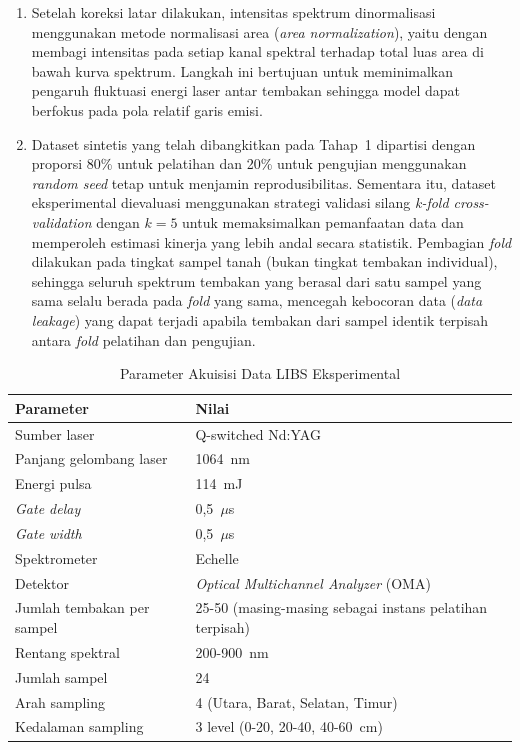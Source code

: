 \begin{enumerate}
    \item Setelah koreksi latar dilakukan, intensitas spektrum dinormalisasi menggunakan metode normalisasi area (\textit{area normalization}), yaitu dengan membagi intensitas pada setiap kanal spektral terhadap total luas area di bawah kurva spektrum. Langkah ini bertujuan untuk meminimalkan pengaruh fluktuasi energi laser antar tembakan sehingga model dapat berfokus pada pola relatif garis emisi.

    \item Dataset sintetis yang telah dibangkitkan pada Tahap~1 dipartisi dengan proporsi 80\% untuk pelatihan dan 20\% untuk pengujian menggunakan \textit{random seed} tetap untuk menjamin reprodusibilitas. Sementara itu, dataset eksperimental dievaluasi menggunakan strategi validasi silang \textit{k-fold cross-validation} dengan $k = 5$ untuk memaksimalkan pemanfaatan data dan memperoleh estimasi kinerja yang lebih andal secara statistik. Pembagian \textit{fold} dilakukan pada tingkat sampel tanah (bukan tingkat tembakan individual), sehingga seluruh spektrum tembakan yang berasal dari satu sampel yang sama selalu berada pada \textit{fold} yang sama, mencegah kebocoran data (\textit{data leakage}) yang dapat terjadi apabila tembakan dari sampel identik terpisah antara \textit{fold} pelatihan dan pengujian.
\end{enumerate}

\begin{table}[htbp]
  \centering
  \caption{Parameter Akuisisi Data LIBS Eksperimental}
  \label{tab:param_eksperimen}
  \small
  \begin{tabularx}{\textwidth}{|l|X|}
    \hline
    \textbf{Parameter} & \textbf{Nilai} \\
    \hline
    Sumber laser & Q-switched Nd:YAG \\
    \hline
    Panjang gelombang laser & 1064~nm \\
    \hline
    Energi pulsa & 114~mJ \\
    \hline
    \textit{Gate delay} & 0,5~$\mu$s \\
    \hline
    \textit{Gate width} & 0,5~$\mu$s \\
    \hline
    Spektrometer & Echelle \\
    \hline
    Detektor & \textit{Optical Multichannel Analyzer} (OMA) \\
    \hline
    Jumlah tembakan per sampel & 25-50 (masing-masing sebagai instans pelatihan terpisah) \\
    \hline
    Rentang spektral & 200-900~nm \\
    \hline
    Jumlah sampel & 24 \\
    \hline
    Arah sampling & 4 (Utara, Barat, Selatan, Timur) \\
    \hline
    Kedalaman sampling & 3 level (0-20, 20-40, 40-60~cm) \\
    \hline
  \end{tabularx}
\end{table}

